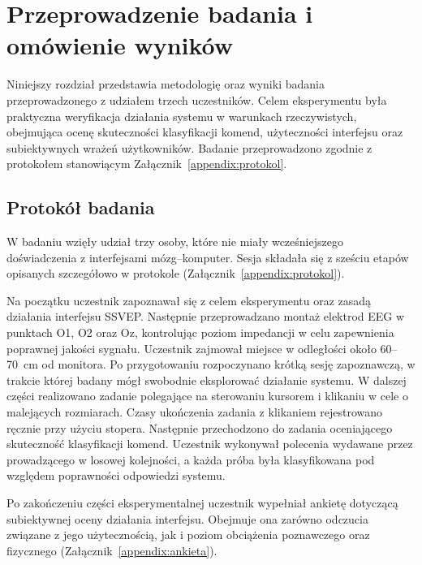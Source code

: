 
\chapter{Przeprowadzenie badania i omówienie wyników}

Niniejszy rozdział przedstawia metodologię oraz wyniki badania
przeprowadzonego z udziałem trzech uczestników. Celem eksperymentu
była praktyczna weryfikacja działania systemu w warunkach rzeczywistych,
obejmująca ocenę skuteczności klasyfikacji komend, użyteczności interfejsu
oraz subiektywnych wrażeń użytkowników. Badanie przeprowadzono zgodnie
z protokołem stanowiącym Załącznik~\ref{appendix:protokol}.

\section{Protokół badania}

W badaniu wzięły udział trzy osoby, które nie miały wcześniejszego
doświadczenia z interfejsami mózg--komputer. Sesja składała się z sześciu
etapów opisanych szczegółowo w protokole (Załącznik~\ref{appendix:protokol}).

Na początku uczestnik zapoznawał się z celem eksperymentu oraz zasadą działania interfejsu SSVEP. Następnie przeprowadzano montaż elektrod EEG w punktach O1, O2 oraz Oz, kontrolując poziom impedancji w celu zapewnienia poprawnej jakości sygnału. Uczestnik zajmował miejsce w odległości około 60--70~cm od monitora. Po przygotowaniu rozpoczynano krótką sesję zapoznawczą, w trakcie której badany mógł swobodnie eksplorować działanie systemu. W dalszej części realizowano zadanie polegające na sterowaniu kursorem i klikaniu w cele o malejących rozmiarach. Czasy ukończenia zadania z klikaniem rejestrowano ręcznie przy użyciu stopera. Następnie przechodzono do zadania oceniającego skuteczność klasyfikacji komend. Uczestnik wykonywał polecenia wydawane przez prowadzącego w losowej kolejności, a każda próba była klasyfikowana pod względem poprawności odpowiedzi systemu.

Po zakończeniu części eksperymentalnej uczestnik wypełniał ankietę dotyczącą subiektywnej oceny działania interfejsu. Obejmuje ona zarówno odczucia związane z jego użytecznością, jak i poziom obciążenia poznawczego oraz fizycznego (Załącznik~\ref{appendix:ankieta}).

